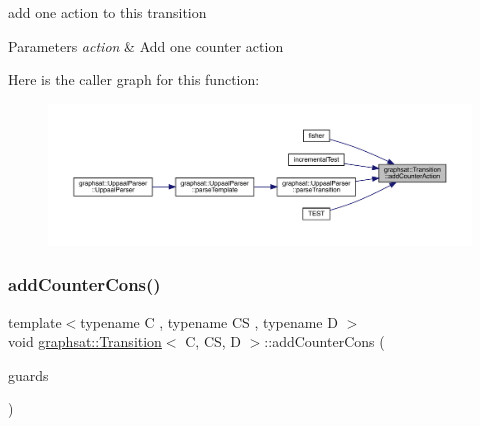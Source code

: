 add one action to this transition


\begin{DoxyParams}{Parameters}
{\em action} & Add one counter action \\
\hline
\end{DoxyParams}
Here is the caller graph for this function\+:
\nopagebreak
\begin{figure}[H]
\begin{center}
\leavevmode
\includegraphics[width=350pt]{classgraphsat_1_1_transition_a8b25340523019a7995e5d77b112bf37f_icgraph}
\end{center}
\end{figure}
\mbox{\label{classgraphsat_1_1_transition_af5e1f394f7a4c0bcdf416d28b8b8f9fb}} 
\subsubsection{\texorpdfstring{addCounterCons()}{addCounterCons()}}
{\footnotesize\ttfamily template$<$typename C , typename CS , typename D $>$ \\
void \mbox{\hyperlink{classgraphsat_1_1_transition}{graphsat\+::\+Transition}}$<$ C, CS, D $>$\+::add\+Counter\+Cons (\begin{DoxyParamCaption}\item[{\mbox{\hyperlink{classgraphsat_1_1_counter_constraint}{Counter\+Constraint}} $\ast$}]{guards }\end{DoxyParamCaption})\hspace{0.3cm}{\ttfamily [inline]}}

